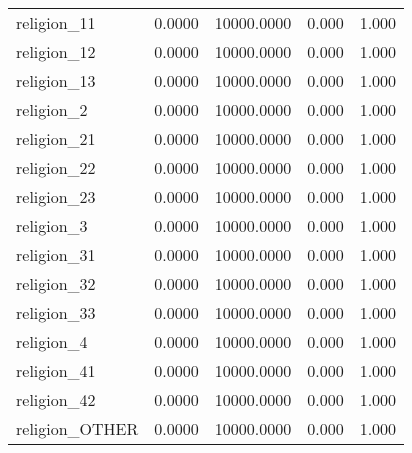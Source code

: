 \begin{table}[htbp]
\begin{tabular}{lcccc}
religion\_11 & 0.0000 & 10000.0000 & 0.000 & 1.000 \\
religion\_12 & 0.0000 & 10000.0000 & 0.000 & 1.000 \\
religion\_13 & 0.0000 & 10000.0000 & 0.000 & 1.000 \\
religion\_2 & 0.0000 & 10000.0000 & 0.000 & 1.000 \\
religion\_21 & 0.0000 & 10000.0000 & 0.000 & 1.000 \\
religion\_22 & 0.0000 & 10000.0000 & 0.000 & 1.000 \\
religion\_23 & 0.0000 & 10000.0000 & 0.000 & 1.000 \\
religion\_3 & 0.0000 & 10000.0000 & 0.000 & 1.000 \\
religion\_31 & 0.0000 & 10000.0000 & 0.000 & 1.000 \\
religion\_32 & 0.0000 & 10000.0000 & 0.000 & 1.000 \\
religion\_33 & 0.0000 & 10000.0000 & 0.000 & 1.000 \\
religion\_4 & 0.0000 & 10000.0000 & 0.000 & 1.000 \\
religion\_41 & 0.0000 & 10000.0000 & 0.000 & 1.000 \\
religion\_42 & 0.0000 & 10000.0000 & 0.000 & 1.000 \\
religion\_OTHER & 0.0000 & 10000.0000 & 0.000 & 1.000 \\
\bottomrule\end{tabular}\end{table}
